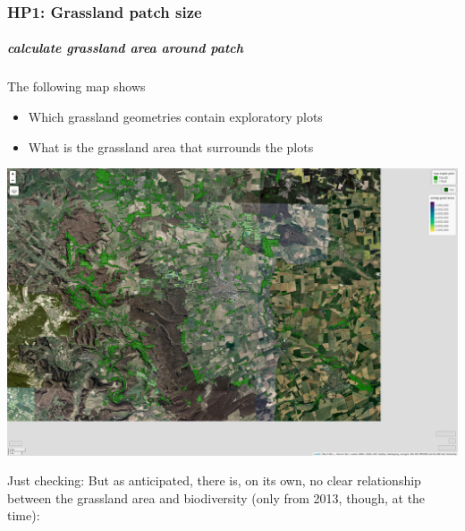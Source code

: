 \documentclass[
  letterpaper,
  DIV=11,
  numbers=noendperiod]{scrartcl}
\let\oldsubparagraph\subparagraph
\renewcommand{\subparagraph}[1]{\oldsubparagraph{#1}\mbox{}}
\begin{document}
\hypertarget{hp1-grassland-patch-size}{%
\subsubsection{HP1: Grassland patch
size}\label{hp1-grassland-patch-size}}

\hypertarget{calculate-grassland-area-around-patch}{%
\subparagraph{calculate grassland area around
patch}\label{calculate-grassland-area-around-patch}}

The following map shows

\begin{itemize}
\item
  Which grassland geometries contain exploratory plots
\item
  What is the grassland area that surrounds the plots
\end{itemize}

\includegraphics{Landscape_Indices_files/figure-pdf/unnamed-chunk-8-1.pdf}

Just checking: But as anticipated, there is, on its own, no clear
relationship between the grassland area and biodiversity (only from
2013, though, at the time):
\end{document}
